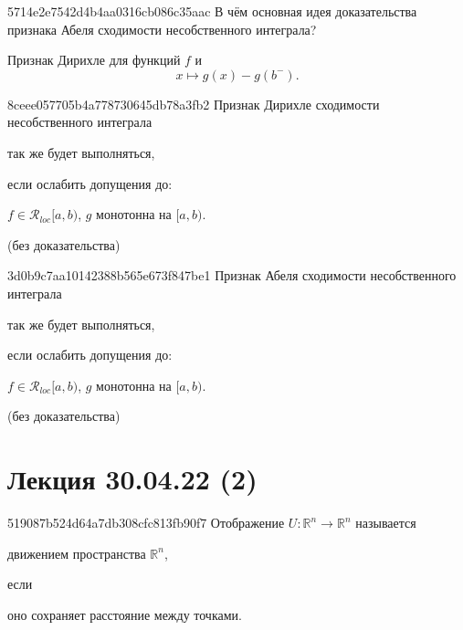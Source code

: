 \begin{note}{5714e2e7542d4b4aa0316cb086c35aac}
    В чём основная идея доказательства признака Абеля сходимости несобственного интеграла?

    \begin{cloze}{1}
        Признак Дирихле для функций \({ f }\) и
        \[
            x \mapsto g(x) - g(b^{-}).
        \]
    \end{cloze}
\end{note}

\begin{note}{8ceee057705b4a778730645db78a3fb2}
    Признак Дирихле сходимости несобственного интеграла \begin{icloze}{2}так же будет выполняться,\end{icloze} если ослабить допущения до:
    \begin{icloze}{1}
        \begin{center}
            \({ f \in \mathcal R_{loc}[a, b) }\), \qquad \({ g }\) монотонна на \({ [a, b) }\).
        \end{center}
    \end{icloze}

    \begin{center}
        \tiny
        (без доказательства)
    \end{center}
\end{note}

\begin{note}{3d0b9c7aa10142388b565e673f847be1}
    Признак Абеля сходимости несобственного интеграла \begin{icloze}{2}так же будет выполняться,\end{icloze} если ослабить допущения до:
    \begin{icloze}{1}
        \begin{center}
            \({ f \in \mathcal R_{loc}[a, b) }\), \qquad \({ g }\) монотонна на \({ [a, b) }\).
        \end{center}
    \end{icloze}

    \begin{center}
        \tiny
        (без доказательства)
    \end{center}
\end{note}

\section{Лекция 30.04.22 (2)}
\begin{note}{519087b524d64a7db308cfc813fb90f7}
    Отображение \({ U : \mathbb R^{n} \to \mathbb R^{n} }\) называется \begin{icloze}{2}движением пространства \({ \mathbb R^{n} }\),\end{icloze} если \begin{icloze}{1}оно сохраняет расстояние между точками.\end{icloze}
\end{note}

